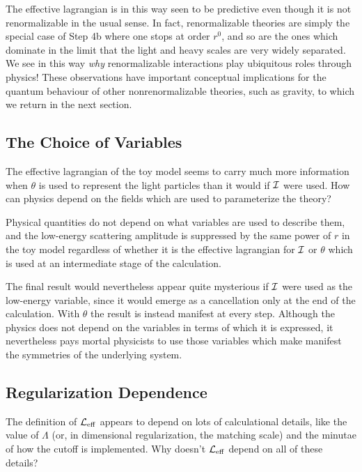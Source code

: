 \documentclass[12pt]{article}
\begin{document}
The effective lagrangian is in this way seen to be predictive
even though it is not renormalizable in the usual sense. In
fact, renormalizable theories are simply the special case
of Step 4b where one stops at order $r^0$, and so are the
ones which dominate in the limit that the light and heavy
scales are very widely separated. 
We see in this way {\it why} renormalizable interactions 
play ubiquitous roles through physics!
These observations have important
conceptual implications for the quantum behaviour of
other nonrenormalizable theories, such as gravity, to which
we return in the next section. 

\subsection{The Choice of Variables}

The effective lagrangian of the toy model seems to
carry much more information when $\theta$ is used to 
represent the light particles than it would if ${\cal I}$ 
were used.
How can physics depend on the fields which are used
to parameterize the theory?

Physical quantities do not depend on what variables are
used to describe them, and the low-energy
scattering amplitude is suppressed by the same power
of $r$ in the toy model regardless of whether it is
the effective lagrangian for ${\cal I}$ or $\theta$
which is used at an intermediate stage of the calculation.

The final result would nevertheless
appear quite mysterious if ${\cal I}$ were
used as the low-energy variable, since it would emerge as
a cancellation only at the end of the calculation. With
$\theta$ the result is instead manifest at every step. 
Although the physics does not depend on the variables
in terms of which it is expressed, it nevertheless pays
mortal physicists to use those variables which make
manifest the symmetries of the underlying system.

\subsection{Regularization Dependence}

The definition of ${\cal L}_{\rm eff}$ appears to
depend on lots of calculational details, like the value of $\Lambda$
(or, in dimensional regularization, the matching scale) and
the minutae of how the cutoff is implemented. Why doesn't
${\cal L}_{\rm eff}$ depend on all of these details? 
\end{document}
